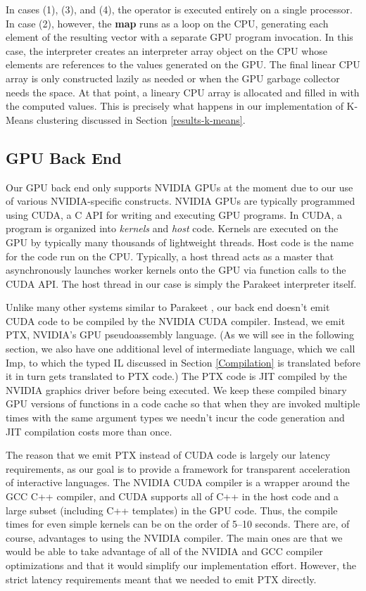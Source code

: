 \documentclass[preprint]{sigplanconf}
\begin{document}
In cases (1), (3), and (4), the operator is executed entirely on a single processor.  In case (2), however, the \textbf{map} runs as a loop on the CPU, generating each element of the resulting vector with a separate GPU program invocation.  In this case, the interpreter creates an interpreter array object on the CPU whose elements are references to the values generated on the GPU.  The final linear CPU array is only constructed lazily as needed or when the GPU garbage collector needs the space.  At that point, a lineary CPU array is allocated and filled in with the computed values.  This is precisely what happens in our implementation of K-Means clustering discussed in Section \ref{results-k-means}.

\subsection{GPU Back End}
Our GPU back end only supports NVIDIA GPUs at the moment due to our use of various NVIDIA-specific constructs. NVIDIA GPUs are typically programmed using CUDA, a C API for writing and executing GPU programs. In CUDA, a program is organized into {\it kernels} and {\it host} code. Kernels are executed on the GPU by typically many thousands of lightweight threads.  Host code is the name for the code run on the CPU. Typically, a host thread acts as a master that asynchronously launches worker kernels onto the GPU via function calls to the CUDA API.  The host thread in our case is simply the Parakeet interpreter itself.

Unlike many other systems similar to Parakeet \cite{Cata10,Chaf11}, our back end doesn't emit CUDA code to be compiled by the NVIDIA CUDA compiler.  Instead, we emit PTX, NVIDIA's GPU pseudoassembly language.  (As we will see in the following section, we also have one additional level of intermediate language, which we call Imp, to which the typed IL discussed in Section \ref{Compilation} is translated before it in turn gets translated to PTX code.)  The PTX code is JIT compiled by the NVIDIA graphics driver before being executed.  We keep these compiled binary GPU versions of functions in a code cache so that when they are invoked multiple times with the same argument types we needn't incur the code generation and JIT compilation costs more than once.

The reason that we emit PTX instead of CUDA code is largely our latency requirements, as our goal is to provide a framework for transparent acceleration of interactive languages. The NVIDIA CUDA compiler is a wrapper around the GCC C++ compiler, and CUDA supports all of C++ in the host code and a large subset (including C++ templates) in the GPU code.  Thus, the compile times for even simple kernels can be on the order of 5--10 seconds.  There are, of course, advantages to using the NVIDIA compiler. The main ones are that we would be able to take advantage of all of the NVIDIA and GCC compiler optimizations and that it would simplify our implementation effort.  However, the strict latency requirements meant that we needed to emit PTX directly.
\end{document}
